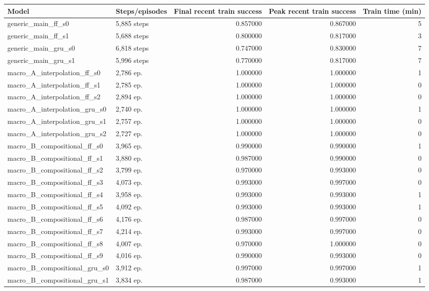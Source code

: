 \begin{tabular}{llrrr}
\toprule
Model & Steps/episodes & Final recent train success & Peak recent train success & Train time (min) \\
\midrule
generic\_main\_ff\_s0 & 5,885 steps & 0.857000 & 0.867000 & 5 \\
generic\_main\_ff\_s1 & 5,688 steps & 0.800000 & 0.817000 & 3 \\
generic\_main\_gru\_s0 & 6,818 steps & 0.747000 & 0.830000 & 7 \\
generic\_main\_gru\_s1 & 5,996 steps & 0.770000 & 0.817000 & 7 \\
macro\_A\_interpolation\_ff\_s0 & 2,786 ep. & 1.000000 & 1.000000 & 1 \\
macro\_A\_interpolation\_ff\_s1 & 2,785 ep. & 1.000000 & 1.000000 & 0 \\
macro\_A\_interpolation\_ff\_s2 & 2,894 ep. & 1.000000 & 1.000000 & 0 \\
macro\_A\_interpolation\_gru\_s0 & 2,740 ep. & 1.000000 & 1.000000 & 1 \\
macro\_A\_interpolation\_gru\_s1 & 2,757 ep. & 1.000000 & 1.000000 & 0 \\
macro\_A\_interpolation\_gru\_s2 & 2,727 ep. & 1.000000 & 1.000000 & 0 \\
macro\_B\_compositional\_ff\_s0 & 3,965 ep. & 0.990000 & 0.990000 & 1 \\
macro\_B\_compositional\_ff\_s1 & 3,880 ep. & 0.987000 & 0.990000 & 0 \\
macro\_B\_compositional\_ff\_s2 & 3,799 ep. & 0.970000 & 0.993000 & 0 \\
macro\_B\_compositional\_ff\_s3 & 4,073 ep. & 0.993000 & 0.997000 & 0 \\
macro\_B\_compositional\_ff\_s4 & 3,958 ep. & 0.993000 & 0.993000 & 1 \\
macro\_B\_compositional\_ff\_s5 & 4,092 ep. & 0.993000 & 0.993000 & 1 \\
macro\_B\_compositional\_ff\_s6 & 4,176 ep. & 0.987000 & 0.997000 & 0 \\
macro\_B\_compositional\_ff\_s7 & 4,214 ep. & 0.993000 & 0.997000 & 0 \\
macro\_B\_compositional\_ff\_s8 & 4,007 ep. & 0.970000 & 1.000000 & 0 \\
macro\_B\_compositional\_ff\_s9 & 4,016 ep. & 0.990000 & 0.993000 & 0 \\
macro\_B\_compositional\_gru\_s0 & 3,912 ep. & 0.997000 & 0.997000 & 1 \\
macro\_B\_compositional\_gru\_s1 & 3,834 ep. & 0.987000 & 0.993000 & 1 \\

\end{tabular}
